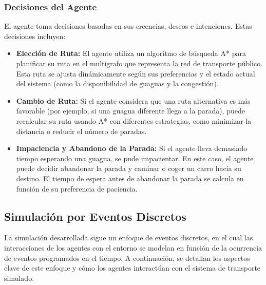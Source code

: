 \documentclass[a4paper,12pt]{article}
\begin{document}
\subsubsection{Decisiones del Agente}

El agente toma decisiones basadas en sus creencias, deseos e intenciones. Estas decisiones incluyen:

\begin{itemize}
    \item \textbf{Elección de Ruta:} El agente utiliza un algoritmo de búsqueda A* para planificar su ruta en el multigrafo que representa la red de transporte público. Esta ruta se ajusta dinámicamente según sus preferencias y el estado actual del sistema (como la disponibilidad de guaguas y la congestión).
    
    \item \textbf{Cambio de Ruta:} Si el agente considera que una ruta alternativa es más favorable (por ejemplo, si una guagua diferente llega a la parada), puede recalcular su ruta usando A* con diferentes estrategias, como minimizar la distancia o reducir el número de paradas.

    \item \textbf{Impaciencia y Abandono de la Parada:} Si el agente lleva demasiado tiempo esperando una guagua, se pude impacientar. En este caso, el agente puede decidir abandonar la parada y caminar o coger un carro hacia su destino. El tiempo de espera antes de abandonar la parada se calcula en función de su preferencia de paciencia.
\end{itemize}
\subsection{Simulación por Eventos Discretos}
La simulación desarrollada sigue un enfoque de eventos discretos, en el cual las interacciones de los agentes con el entorno se modelan en función de la ocurrencia de eventos programados en el tiempo. A continuación, se detallan los aspectos clave de este enfoque y cómo los agentes interactúan con el sistema de transporte simulado.
\end{document}
